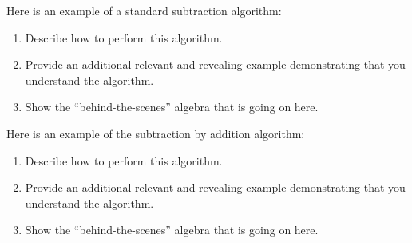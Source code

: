 \documentclass[nooutcomes]{ximera}
\begin{document}
\begin{problem}Here is an example of a standard subtraction
  algorithm:
\begin{image}
\end{image}
\begin{enumerate}
\item Describe how to perform this algorithm.
\item Provide an additional relevant and revealing example
  demonstrating that you understand the algorithm.
\item Show the ``behind-the-scenes'' algebra that is going on here.
\end{enumerate}
\end{problem} 

\begin{problem}Here is an example of the subtraction by addition
  algorithm:
\begin{image}
\end{image}
\begin{enumerate}
\item Describe how to perform this algorithm.
\item Provide an additional relevant and revealing example
  demonstrating that you understand the algorithm.
\item Show the ``behind-the-scenes'' algebra that is going on here.
\end{enumerate}
\end{problem} 
\end{document}
